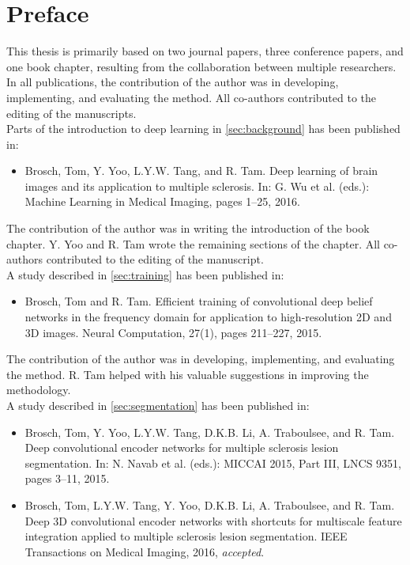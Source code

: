 \chapter*{Preface}

This thesis is primarily based on two journal papers, three conference
papers, and one book chapter, resulting from the collaboration between multiple
researchers. In all publications, the contribution of the author was in
developing, implementing, and evaluating the method. All co-authors
contributed to the editing of the manuscripts.
\\[1em]
Parts of the introduction to deep learning in \ref{sec:background} has been
published in:
\begin{itemize}
\item Brosch, Tom, Y. Yoo, L.Y.W. Tang, and R. Tam.
Deep learning of brain images and its application to multiple sclerosis.
In: G. Wu et al. (eds.): Machine Learning in Medical Imaging, pages 1--25,
2016.
\end{itemize}
The contribution of the author was in writing the introduction of the book
chapter. Y. Yoo and R. Tam wrote the remaining sections of the chapter. All
co-authors contributed to the editing of the manuscript.
\\[1em]
A study described in \ref{sec:training} has been published in:
\begin{itemize}
\item Brosch, Tom and R. Tam. Efficient training of convolutional deep
belief networks in the frequency domain for application to high-resolution 2D
and 3D images. Neural Computation, 27(1), pages 211--227, 2015.
\end{itemize}
The contribution of the author was in developing, implementing, and evaluating
the method. R. Tam helped with his valuable suggestions in improving the
methodology.
\\[1em]
A study described in \ref{sec:segmentation} has been published in:
\begin{itemize}
\item Brosch, Tom, Y. Yoo, L.Y.W. Tang, D.K.B. Li, A. Traboulsee, and R. Tam.
Deep convolutional encoder networks for multiple sclerosis lesion segmentation.
In: N. Navab et al. (eds.): MICCAI 2015, Part III, LNCS 9351, pages 3--11, 2015.
\item Brosch, Tom, L.Y.W. Tang, Y. Yoo, D.K.B. Li, A. Traboulsee, and R. Tam.
Deep 3D convolutional encoder networks with shortcuts for multiscale feature
integration applied to multiple sclerosis lesion segmentation. IEEE Transactions
on Medical Imaging, 2016, \emph{accepted}.
\end{itemize}
